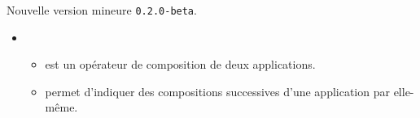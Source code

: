 Nouvelle version mineure \verb+0.2.0-beta+.

\begin{itemize}[itemsep=.5em]
    \item {}
    \begin{itemize}[itemsep=.5em]
        \item {} est un opérateur de composition de deux applications.

        \item {} permet d'indiquer des compositions successives d'une application par elle-même.
    \end{itemize}





    \separation
\end{itemize}

